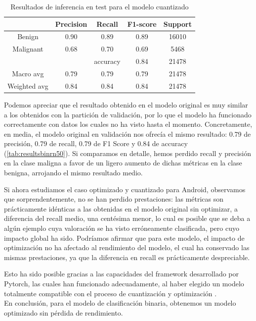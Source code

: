 \begin{table}[!ht]
	\centering
	\begin{tabular}{|c|c|c|c|c|}
		\hline
		~ & Precision & Recall & F1-score & Support \\ \hline
		Benign & 0.90 & 0.89 & 0.89 & 16010 \\ 
		Malignant & 0.68 & 0.70 & 0.69 & 5468 \\ \hline
		~ & ~ & accuracy & 0.84 & 21478 \\ \hline
		Macro avg & 0.79 & 0.79 & 0.79 & 21478 \\ 
		Weighted avg & 0.84 & 0.84 & 0.84 & 21478 \\ \hline
	\end{tabular}
	\caption{Resultados de inferencia en test para el modelo cuantizado}
	\label{tab:bintestquant}
\end{table}

Podemos apreciar que el resultado obtenido en el modelo original es muy similar a los obtenidos con la partición de validación, por lo que el modelo ha funcionado correctamente con datos los cuales no ha visto hasta el momento. Concretamente, en media, el modelo original en validación nos ofrecía el mismo resultado:  0.79 de precisión, 0.79 de recall,  0.79  de F1 Score y 0.84 de accuracy (\ref{tab:resultsbinrn50}). Si comparamos en detalle, hemos perdido recall y precisión en la clase maligna a favor de un ligero aumento de dichas métricas en la clase benigna, arrojando el mismo resultado medio. 

Si ahora estudiamos el caso optimizado y cuantizado para Android, observamos que sorprendentemente, no se han perdido prestaciones: las métricas son prácticamente idénticas a las obtenidas en el modelo original sin optimizar, a diferencia del recall medio, una centésima menor, lo cual es posible que se deba a algún ejemplo cuya valoración se ha visto erróneamente clasificada, pero cuyo impacto global ha sido. Podríamos afirmar que para este modelo, el impacto de optimización no ha afectado al rendimiento del modelo, el cual ha conservado las mismas prestaciones, ya que la diferencia en recall es prácticamente despreciable.

Esto ha sido posible gracias a las capacidades del framework desarrollado por Pytorch, las cuales han funcionado adecuadamente, al haber elegido un modelo totalmente compatible con el proceso de cuantización y optimización \cite{comptquant}.\\

En conclusión, para el modelo de clasificación binaria, obtenemos un modelo optimizado sin pérdida de rendimiento.

